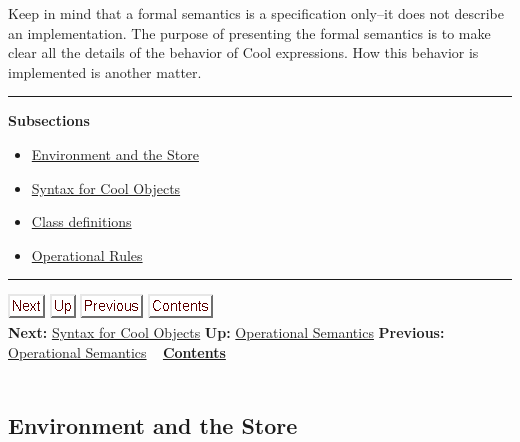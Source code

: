 \documentclass[]{article}
\begin{document}
Keep in mind that a formal semantics is a specification only--it does
not describe an implementation. The purpose of presenting the formal
semantics is to make clear all the details of the behavior of Cool
expressions. How this behavior is implemented is another matter.

\begin{center}\rule{3in}{0.4pt}\end{center}

\textbf{Subsections}

\begin{itemize}
\itemsep1pt\parskip0pt
\item
  \href{node45.html}{Environment and the Store}
\item
  \href{node46.html}{Syntax for Cool Objects}
\item
  \href{node47.html}{Class definitions}
\item
  \href{node48.html}{Operational Rules}
\end{itemize}

\begin{center}\rule{3in}{0.4pt}\end{center}

\href{node46.html}{\includegraphics{next.png}}
\href{node44.html}{\includegraphics{up.png}}
\href{node44.html}{\includegraphics{prev.png}}
\href{node1.html}{\includegraphics{contents.png}} \\ \textbf{Next:}
\href{node46.html}{Syntax for Cool Objects} \textbf{Up:}
\href{node44.html}{Operational Semantics} \textbf{Previous:}
\href{node44.html}{Operational Semantics} ~
\textbf{\href{node1.html}{Contents}} \\ \\

\subsection{Environment and the Store}
\end{document}
